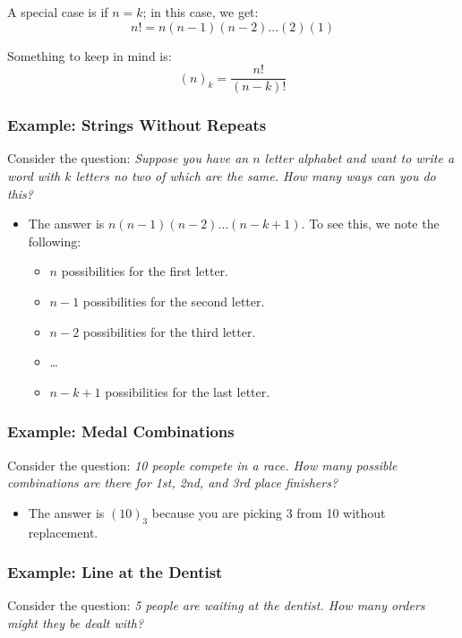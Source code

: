 \documentclass[letterpaper]{article}
\begin{document}
\bigskip

A special case is if $n = k$; in this case, we get:
\[n! = n(n - 1)(n - 2)...(2)(1)\]

\bigskip 

Something to keep in mind is:
\[(n)_k = \frac{n!}{(n - k)!}\]

\subsubsection{Example: Strings Without Repeats}
Consider the question: \emph{Suppose you have an $n$ letter alphabet and want to write a word with $k$ letters no two of which are the same. How many ways can you do this?} 

\begin{itemize}
    \item The answer is $n(n - 1)(n - 2)\dots(n - k + 1)$. To see this, we note the following:
    \begin{itemize}
        \item $n$ possibilities for the first letter.
        \item $n - 1$ possibilities for the second letter.
        \item $n - 2$ possibilities for the third letter.
        \item \dots
        \item $n - k + 1$ possibilities for the last letter.
    \end{itemize}
\end{itemize}

\subsubsection{Example: Medal Combinations}
Consider the question: \emph{10 people compete in a race. How many possible combinations are there for 1st, 2nd, and 3rd place finishers?} 

\begin{itemize}
    \item The answer is $(10)_3$ because you are picking 3 from 10 without replacement.
\end{itemize}

\subsubsection{Example: Line at the Dentist}
Consider the question: \emph{5 people are waiting at the dentist. How many orders might they be dealt with?} 
\end{document}
